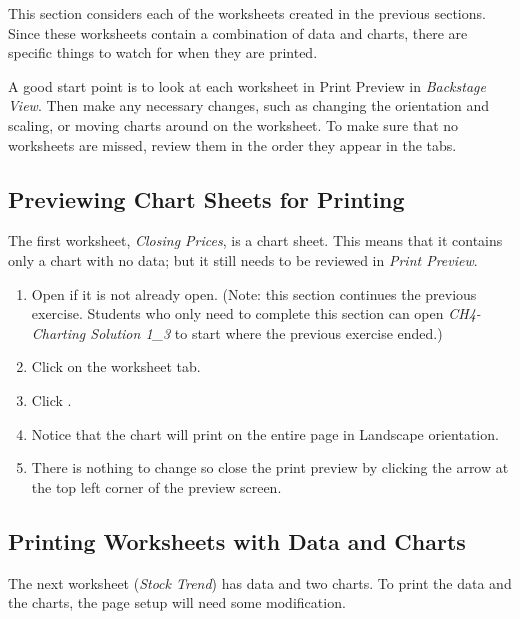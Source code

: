 This section considers each of the worksheets created in the previous sections. Since these worksheets contain a combination of data and charts, there are specific things to watch for when they are printed.

A good start point is to look at each worksheet in Print Preview in \textit{Backstage View}. Then make any necessary changes, such as changing the orientation and scaling, or moving charts around on the worksheet. To make sure that no worksheets are missed, review them in the order they appear in the tabs.

\subsection{Previewing Chart Sheets for Printing}

The first worksheet, \textit{Closing Prices}, is a chart sheet. This means that it contains only a chart with no data; but it still needs to be reviewed in \textit{Print Preview}.

\begin{enumerate}
	\item Open  if it is not already open. (Note: this section continues the previous exercise. Students who only need to complete this section can open \textit{CH4-Charting Solution 1\_3} to start where the previous exercise ended.)
	\item Click on the  worksheet tab.
	\item Click .
	\item Notice that the chart will print on the entire page in Landscape orientation.
	\item There is nothing to change so close the print preview by clicking the arrow at the top left corner of the preview screen.
\end{enumerate}

\subsection{Printing Worksheets with Data and Charts}

The next worksheet (\textit{Stock Trend}) has data and two charts. To print the data and the charts, the page setup will need some modification.


